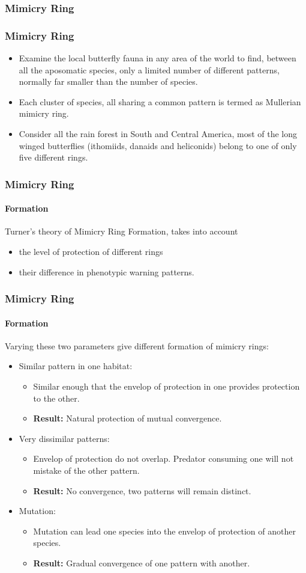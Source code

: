 \subsubsection{Mimicry Ring}

\frame
{
	\frametitle{Mimicry Ring}
	
	\begin{itemize}
		\item Examine the local butterfly fauna in any area of the world to find, between all the aposomatic species, only a limited number of different patterns, normally far smaller than the number of species.
		\item Each cluster of species, all sharing a common pattern is termed as Mullerian mimicry ring.
		\item Consider all the rain forest in South and Central America, most of the long winged butterflies (ithomiids, danaids and heliconids) belong to one of only five different rings.
	\end{itemize}	
}

\frame
{
	\frametitle{Mimicry Ring}
	\framesubtitle{Formation}
	
	Turner's theory of Mimicry Ring Formation, takes into account
	\begin{itemize}
		\item the level of protection of different rings
		\item their difference in phenotypic warning patterns.
	\end{itemize}
	
}

\frame
{
	\frametitle{Mimicry Ring}
	\framesubtitle{Formation}

	Varying these two parameters give different formation of mimicry rings:
	\begin{itemize}
		\item Similar pattern in one habitat:
			\begin{itemize}
				\item Similar enough that the envelop of protection in one provides protection to the other.
				\item \textbf{Result:} Natural protection of mutual convergence.
			\end{itemize}
		\item Very dissimilar patterns:
			\begin{itemize}
				\item Envelop of protection do not overlap. Predator consuming one will not mistake of the other pattern.
				\item \textbf{Result:} No convergence, two patterns will remain distinct.
			\end{itemize}
		\item Mutation:
			\begin{itemize}
				\item Mutation can lead one species into the envelop of protection of another species. 
				\item \textbf{Result:} Gradual convergence of one pattern with another.
			\end{itemize}
	\end{itemize}
}